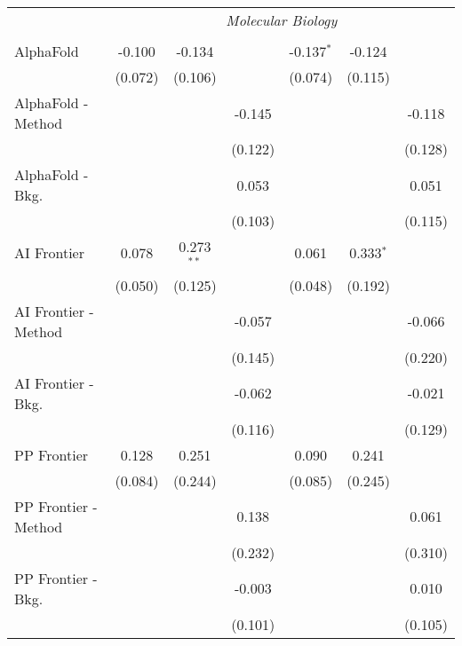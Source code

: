 \begin{tabular}{lcccccc}
 & \multicolumn{6}{c}{\textit{Molecular Biology}} \\ \\
   AlphaFold            & -0.100  & -0.134         &         & -0.137$^{*}$ & -0.124        &   \\   
                        & (0.072) & (0.106)        &         & (0.074)      & (0.115)       &   \\   
   AlphaFold - Method   &         &                & -0.145  &              &               & -0.118\\   
                        &         &                & (0.122) &              &               & (0.128)\\   
   AlphaFold - Bkg.     &         &                & 0.053   &              &               & 0.051\\   
                        &         &                & (0.103) &              &               & (0.115)\\   
   AI Frontier          & 0.078   & 0.273$^{**}$   &         & 0.061        & 0.333$^{*}$   &   \\   
                        & (0.050) & (0.125)        &         & (0.048)      & (0.192)       &   \\   
   AI Frontier - Method &         &                & -0.057  &              &               & -0.066\\   
                        &         &                & (0.145) &              &               & (0.220)\\   
   AI Frontier - Bkg.   &         &                & -0.062  &              &               & -0.021\\   
                        &         &                & (0.116) &              &               & (0.129)\\   
   PP Frontier          & 0.128   & 0.251          &         & 0.090        & 0.241         &   \\   
                        & (0.084) & (0.244)        &         & (0.085)      & (0.245)       &   \\   
   PP Frontier - Method &         &                & 0.138   &              &               & 0.061\\   
                        &         &                & (0.232) &              &               & (0.310)\\   
   PP Frontier - Bkg.   &         &                & -0.003  &              &               & 0.010\\   
                        &         &                & (0.101) &              &               & (0.105)\\   

\end{tabular}
